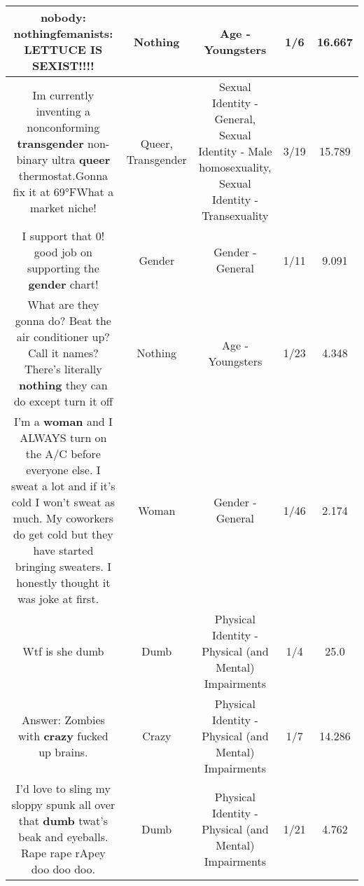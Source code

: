 \documentclass[11pt]{article}
\newlength\mylength
\begin{document}
\begin{center}
\begin{longtable}{|C{.65\mylength}|C{.30\mylength}|C{.12\mylength}|C{.12\mylength}|C{.12\mylength}|}
  \small nobody: \textbf{nothing}femanists: LETTUCE IS SEXIST!!!!\normalsize   & Nothing & Age - Youngsters & 1/6 & 16.667 \\  \hline
  \small Im currently inventing a nonconforming \textbf{transgender} non-binary ultra \textbf{q\textbf{ueer}} thermostat.Gonna fix it at 69°FWhat a market niche!\normalsize   & Queer, Transgender & Sexual Identity - General, Sexual Identity - Male homosexuality, Sexual Identity - Transexuality & 3/19 & 15.789 \\  \hline
  \small I support that 0! good job on supporting the \textbf{gender} chart!\normalsize   & Gender & Gender - General & 1/11 & 9.091 \\  \hline
  \small What are they gonna do? Beat the air conditioner up? Call it names? There's literally \textbf{nothing} they can do except turn it off\normalsize   & Nothing & Age - Youngsters & 1/23 & 4.348 \\  \hline
  \small I'm a \textbf{woman} and I ALWAYS turn on the A/C before everyone else. I sweat a lot and if it's cold I won't sweat as much. My coworkers do get cold but they have started bringing sweaters. I honestly thought it was joke at first. 🤦‍♀️\normalsize   & Woman & Gender - General & 1/46 & 2.174 \\  \hline
  \small Wtf is she dumb\normalsize   & Dumb & Physical Identity - Physical (and Mental) Impairments & 1/4 & 25.0 \\  \hline
  \small Answer: Zombies with \textbf{crazy} fucked up brains.\normalsize   & Crazy & Physical Identity - Physical (and Mental) Impairments & 1/7 & 14.286 \\  \hline
  \small I'd love to sling my sloppy spunk all over that \textbf{dumb} twat's beak and eyeballs. Rape rape rApey doo doo doo.\normalsize   & Dumb & Physical Identity - Physical (and Mental) Impairments & 1/21 & 4.762 \\  \hline

\end{longtable}
\end{center}
\end{document}
